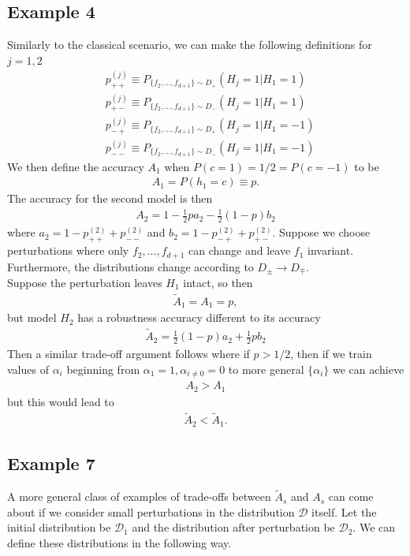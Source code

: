 \documentclass[onecolumn,prx, superscriptaddress,longbibliography,margin=1mm 11pt]{revtex4-2}
\begin{document}
\subsection*{Example 4} 
Similarly to the classical scenario, we can make the following definitions for $j=1,2$
\begin{align}
     & p^{(j)}_{++} \equiv P_{\{f_2,...,f_{d+1}\}\sim D_+}  (H_j=1|H_1=1) \nonumber \\
    & p^{(j)}_{+-} \equiv P_{\{f_2,...,f_{d+1}\}\sim D_-}  (H_j=1|H_1=1)\nonumber \\
    & p^{(j)}_{-+} \equiv P_{\{f_2,...,f_{d+1}\}\sim D_+}  (H_j=1|H_1=-1) \nonumber \\
     & p^{(j)}_{--} \equiv P_{\{f_2,...,f_{d+1}\}\sim D_-}  (H_j=1|H_1=-1)
\end{align}
We then define the accuracy $A_1$ when $P(c=1)=1/2=P(c=-1)$ to be 
\begin{align}
    A_1=P(h_1=c) \equiv p.
\end{align}
The accuracy for the second model is then
\begin{align} 
A_2=1-\frac{1}{2}pa_2-\frac{1}{2}(1-p)b_2
\end{align}
where $a_2=1-p^{(2)}_{++}+p^{(2)}_{--}$ and $b_2=1-p^{(2)}_{-+}+p^{(2)}_{+-}$. Suppose we choose perturbations where only $f_2,...,f_{d+1}$ can change and leave $f_1$ invariant. Furthermore, the distributions change according to $D_{\pm} \rightarrow D_{\mp}$. \\

Suppose the perturbation leaves $H_1$ intact, so then 
\begin{align}
    \tilde{A}_1=A_1=p,
\end{align}
but model $H_2$ has a robustness accuracy different to its accuracy
\begin{align}
    \tilde{A}_2=\frac{1}{2}(1-p)a_2+\frac{1}{2}pb_2
\end{align}
Then a similar trade-off argument follows where if $p>1/2$, then if we train values of $\alpha_i$ beginning from $\alpha_1=1, \alpha_{i \neq 0}=0$ to more general $\{\alpha_i \}$ we can achieve
\begin{align}
    A_2>A_1
\end{align}
but this would lead to 
\begin{align}
    \tilde{A}_2<\tilde{A}_1.
\end{align} 
\subsection*{Example 7} 
A more general class of examples of trade-offs between $\tilde{A}_s$ and $A_s$ can come about if we consider small perturbations in the distribution $\mathcal{D}$ itself. Let the initial distribution be $\mathcal{D}_1$ and the distribution after perturbation be $\mathcal{D}_2$. We can define these distributions in the following way.\\
\end{document}

